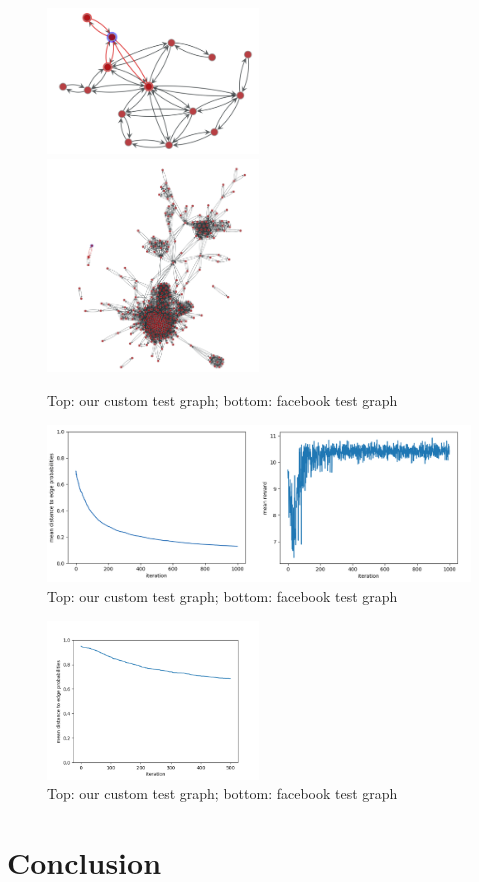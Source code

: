 \documentclass[a4paper,12pt]{article}
\begin{document}
 \begin{figure}
  \centering
    \includegraphics[width=0.5\textwidth]{test_graph.png}
        \includegraphics[width=0.5\textwidth]{facebook.png}
      \caption{Top: our custom test graph; bottom: facebook test graph}
        \label{fig:testgraph}
\end{figure}

 \begin{figure}
  \centering
    \includegraphics[width=\textwidth]{total_test.png}
      \caption{Top: our custom test graph; bottom: facebook test graph}
        \label{fig:testgraph}
\end{figure}


 \begin{figure}
  \centering
    \includegraphics[width=0.5\textwidth]{conv_weights_twitter.png}
      \caption{Top: our custom test graph; bottom: facebook test graph}
        \label{fig:testgraph}
\end{figure}



\section{Conclusion}

\newpage



\end{document}
